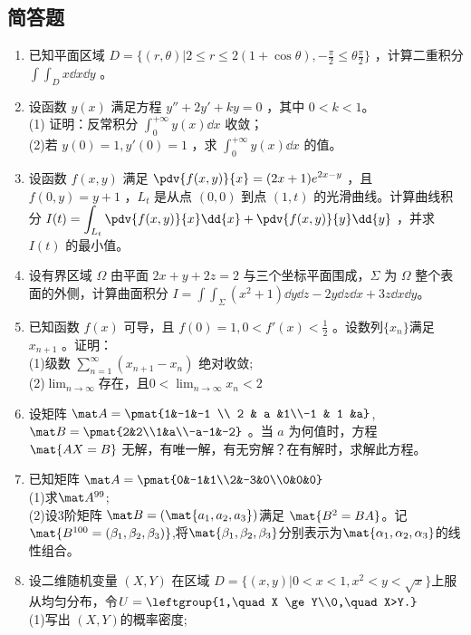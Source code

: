 \subsection{简答题}
\begin{enumerate}
\item 已知平面区域 $\displaystyle D=\{(r,\theta)|2 \le r \le 2(1+\cos \theta),-\frac{\pi}{2} \le \theta \frac{\pi}{2}\}$  ，计算二重积分 $\displaystyle \int\int_D x\dd{x}\dd{y}$ 。
\item 设函数 $y(x)$ 满足方程 $y''+2y'+ky=0$ ，其中 $0<k<1$。\\
(1) 证明：反常积分  $\displaystyle \int_0^{+\infty} y(x)\dd{x}$ 收敛；\\
(2)若 $y(0)=1,y'(0)=1$  ，求 $\displaystyle \int_0^{+\infty} y(x)\dd{x}$ 的值。
\item 设函数 $f(x,y)$ 满足 $\displaystyle \pdv{f(x,y)}{x}=(2x+1)e^{2x-y}$ ，且 $f(0,y)=y+1$  ，$L_t$ 是从点 $(0,0)$ 到点 $(1,t)$ 的光滑曲线。计算曲线积分 $\displaystyle I(t)=\int_{L_t}\pdv{f(x,y)}{x}\dd{x}+\pdv{f(x,y)}{y}\dd{y}$ ，并求 $I(t)$ 的最小值。
\item 设有界区域 $\Omega$ 由平面 $2x+y+2z=2$ 与三个坐标平面围成，$\Sigma$  为 $\Omega$ 整个表面的外侧，计算曲面积分 $\displaystyle I=\int\int_\Sigma (x^2+1)\dd{y}\dd{z}-2y\dd{z}\dd{x}+3z\dd{x}\dd{y}$。
\item 已知函数 $f(x)$ 可导，且 $f(0)=1,0<f'(x)<\frac{1}{2}$ 。设数列$\{{x_n}\}$满足 $x_{n+1}$ 。证明：\\
(1)级数 $\displaystyle \sum_{n=1}^\infty(x_{n+1}-x_n)$ 绝对收敛;\\
(2)$\displaystyle \lim_{n \to \infty}$存在，且$\displaystyle 0<\lim_{n \to \infty}x_n<2$
\item 设矩阵 $\mat A=\pmat{1&-1&-1 \\ 2 & a &1\\-1 & 1 &a}$,$\mat B=\pmat{2&2\\1&a\\-a-1&-2}$  。当 $a$ 为何值时，方程 $\mat{AX=B}$ 无解，有唯一解，有无穷解？在有解时，求解此方程。
\item 已知矩阵 $\mat A=\pmat{0&-1&1\\2&-3&0\\0&0&0}$\\
(1)求$\mat A^{99}$;\\
(2)设3阶矩阵 $\mat B=(\mat{a_1,a_2,a_3})$满足 $\mat {B^2=BA}$。记 $\mat {B^{100}=(\beta_1,\beta_2,\beta_3)}$,将$\mat{\beta_1,\beta_2,\beta_3}$分别表示为$\mat{\alpha_1,\alpha_2,\alpha_3}$的线性组合。
\item 设二维随机变量 $(X,Y)$ 在区域  $D=\{(x,y)|0<x<1,x^2<y<\sqrt{x}\}$上服从均匀分布，令$U=\leftgroup{1,\quad X  \ge Y\\0,\quad X>Y.}$\\
(1)写出 $(X,Y) $的概率密度;
\end{enumerate}
